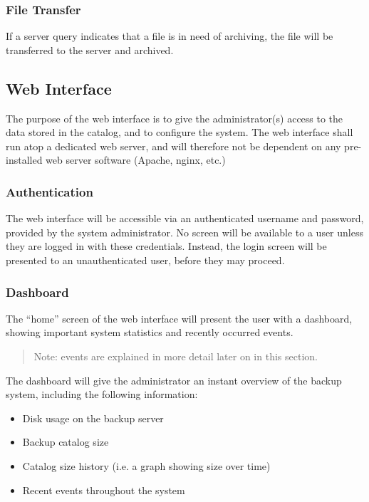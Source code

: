 \subsubsection{File Transfer}

If a server query indicates that a file is in need of archiving, the file will
be transferred to the server and archived.

\subsection{Web Interface}

The purpose of the web interface is to give the administrator(s) access to the
data stored in the catalog, and to configure the system. The web interface
shall run atop a dedicated web server, and will therefore not be dependent on
any pre-installed web server software (Apache, nginx, etc.)

\subsubsection{Authentication}

The web interface will be accessible via an authenticated username and
password, provided by the system administrator. No screen will be available to
a user unless they are logged in with these credentials. Instead, the login
screen will be presented to an unauthenticated user, before they may proceed.

\subsubsection{Dashboard}

The ``home'' screen of the web interface will present the user with
a dashboard, showing important system statistics and recently occurred events.

\begin{quote}
    Note: events are explained in more detail later on in this section.
\end{quote}

The dashboard will give the administrator an instant overview of the backup
system, including the following information:

\begin{itemize}
    \item Disk usage on the backup server
    \item Backup catalog size
    \item Catalog size history (i.e. a graph showing size over time)
    \item Recent events throughout the system
\end{itemize}

